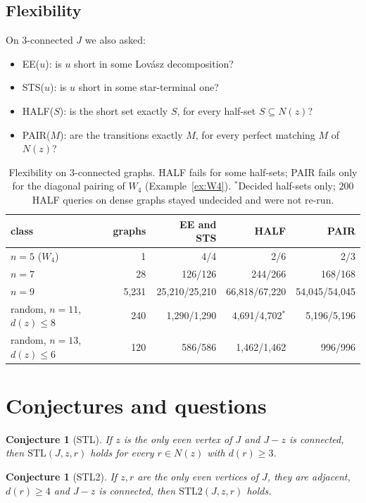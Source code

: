 \documentclass[11pt]{amsart}
\newtheorem{conjecture}[theorem]{Conjecture}
\theoremstyle{definition}
\newcommand{\STL}{\mathrm{STL}}
\begin{document}
\subsection{Flexibility}
On $3$-connected $J$ we also asked:
\begin{itemize}
\item EE($u$): is $u$ short in some Lov\'asz decomposition?
\item STS($u$): is $u$ short in some star-terminal one?
\item HALF($S$): is the short set exactly $S$, for every half-set $S\subseteq N(z)$?
\item PAIR($M$): are the transitions exactly $M$, for every perfect matching $M$ of $N(z)$?
\end{itemize}

\begin{table}[!ht]
\centering\footnotesize
\begin{tabular}{@{}lrrrr@{}}
\toprule
class & graphs & EE and STS & HALF & PAIR\\
\midrule
$n=5$ ($W_4$) & 1 & 4/4 & 2/6 & 2/3\\
$n=7$ & 28 & 126/126 & 244/266 & 168/168\\
$n=9$ & 5{,}231 & 25{,}210/25{,}210 & 66{,}818/67{,}220 & 54{,}045/54{,}045\\
random, $n=11$, $d(z)\le8$ & 240 & 1{,}290/1{,}290 & 4{,}691/4{,}702$^*$ & 5{,}196/5{,}196\\
random, $n=13$, $d(z)\le6$ & 120 & 586/586 & 1{,}462/1{,}462 & 996/996\\
\bottomrule
\end{tabular}
\caption{Flexibility on $3$-connected graphs. HALF fails for some half-sets; PAIR fails only for the
diagonal pairing of $W_4$ (Example~\ref{ex:W4}). $^*$Decided half-sets only; $200$ HALF queries on
dense graphs stayed undecided and were not re-run.}
\label{tab:flex}
\end{table}

\section{Conjectures and questions}\label{sec:conj}

\begin{conjecture}[STL]\label{conj:stl}
If $z$ is the only even vertex of $J$ and $J-z$ is connected, then $\STL(J,z,r)$ holds for every
$r\in N(z)$ with $d(r)\ge3$.
\end{conjecture}

\begin{conjecture}[STL2]\label{conj:stl2}
If $z,r$ are the only even vertices of $J$, they are adjacent, $d(r)\ge4$ and $J-z$ is connected,
then $\STL2(J,z,r)$ holds.
\end{conjecture}
\end{document}
